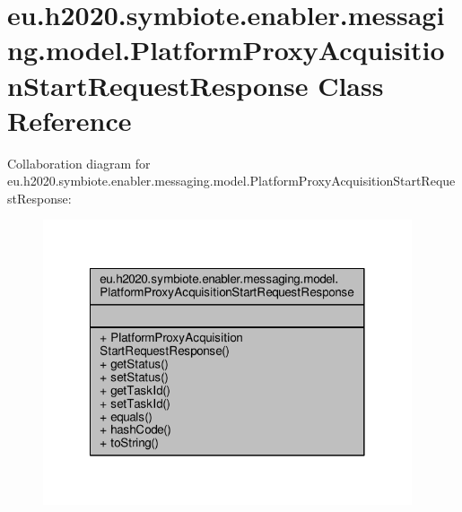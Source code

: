 \hypertarget{classeu_1_1h2020_1_1symbiote_1_1enabler_1_1messaging_1_1model_1_1PlatformProxyAcquisitionStartRequestResponse}{}\section{eu.\+h2020.\+symbiote.\+enabler.\+messaging.\+model.\+Platform\+Proxy\+Acquisition\+Start\+Request\+Response Class Reference}
\label{classeu_1_1h2020_1_1symbiote_1_1enabler_1_1messaging_1_1model_1_1PlatformProxyAcquisitionStartRequestResponse}


Collaboration diagram for eu.\+h2020.\+symbiote.\+enabler.\+messaging.\+model.\+Platform\+Proxy\+Acquisition\+Start\+Request\+Response\+:\nopagebreak
\begin{figure}[H]
\begin{center}
\leavevmode
\includegraphics[width=308pt]{classeu_1_1h2020_1_1symbiote_1_1enabler_1_1messaging_1_1model_1_1PlatformProxyAcquisitionStartRequestResponse__coll__graph}
\end{center}
\end{figure}
